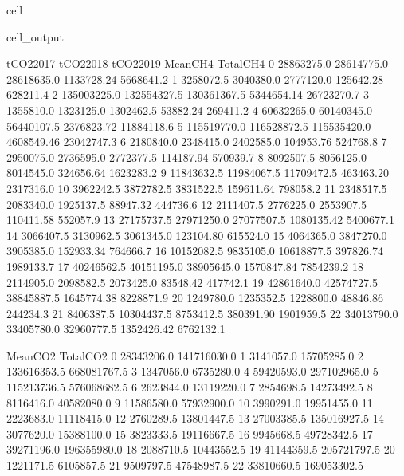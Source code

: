 \documentclass[letterpaper,10pt,english]{jupyterBook}
\begin{document}
\begin{sphinxuseclass}{cell}
\begin{sphinxVerbatimOutput}
\begin{sphinxuseclass}{cell_output}
\begin{sphinxVerbatim}[commandchars=\\\{\}]
      tCO2\PYGZus{}2017    tCO2\PYGZus{}2018    tCO2\PYGZus{}2019    Mean\PYGZus{}CH4   Total\PYGZus{}CH4  \PYGZbs{}
0    28863275.0   28614775.0   28618635.0  1133728.24   5668641.2   
1     3258072.5    3040380.0    2777120.0   125642.28    628211.4   
2   135003225.0  132554327.5  130361367.5  5344654.14  26723270.7   
3     1355810.0    1323125.0    1302462.5    53882.24    269411.2   
4    60632265.0   60140345.0   56440107.5  2376823.72  11884118.6   
5   115519770.0  116528872.5  115535420.0  4608549.46  23042747.3   
6     2180840.0    2348415.0    2402585.0   104953.76    524768.8   
7     2950075.0    2736595.0    2772377.5   114187.94    570939.7   
8     8092507.5    8056125.0    8014545.0   324656.64   1623283.2   
9    11843632.5   11984067.5   11709472.5   463463.20   2317316.0   
10    3962242.5    3872782.5    3831522.5   159611.64    798058.2   
11    2348517.5    2083340.0    1925137.5    88947.32    444736.6   
12    2111407.5    2776225.0    2553907.5   110411.58    552057.9   
13   27175737.5   27971250.0   27077507.5  1080135.42   5400677.1   
14    3066407.5    3130962.5    3061345.0   123104.80    615524.0   
15    4064365.0    3847270.0    3905385.0   152933.34    764666.7   
16   10152082.5    9835105.0   10618877.5   397826.74   1989133.7   
17   40246562.5   40151195.0   38905645.0  1570847.84   7854239.2   
18    2114905.0    2098582.5    2073425.0    83548.42    417742.1   
19   42861640.0   42574727.5   38845887.5  1645774.38   8228871.9   
20    1249780.0    1235352.5    1228800.0    48846.86    244234.3   
21    8406387.5   10304437.5    8753412.5   380391.90   1901959.5   
22   34013790.0   33405780.0   32960777.5  1352426.42   6762132.1   

       Mean\PYGZus{}CO2    Total\PYGZus{}CO2  
0    28343206.0  141716030.0  
1     3141057.0   15705285.0  
2   133616353.5  668081767.5  
3     1347056.0    6735280.0  
4    59420593.0  297102965.0  
5   115213736.5  576068682.5  
6     2623844.0   13119220.0  
7     2854698.5   14273492.5  
8     8116416.0   40582080.0  
9    11586580.0   57932900.0  
10    3990291.0   19951455.0  
11    2223683.0   11118415.0  
12    2760289.5   13801447.5  
13   27003385.5  135016927.5  
14    3077620.0   15388100.0  
15    3823333.5   19116667.5  
16    9945668.5   49728342.5  
17   39271196.0  196355980.0  
18    2088710.5   10443552.5  
19   41144359.5  205721797.5  
20    1221171.5    6105857.5  
21    9509797.5   47548987.5  
22   33810660.5  169053302.5  
\end{sphinxVerbatim}

\end{sphinxuseclass}\end{sphinxVerbatimOutput}

\end{sphinxuseclass}
\end{document}
